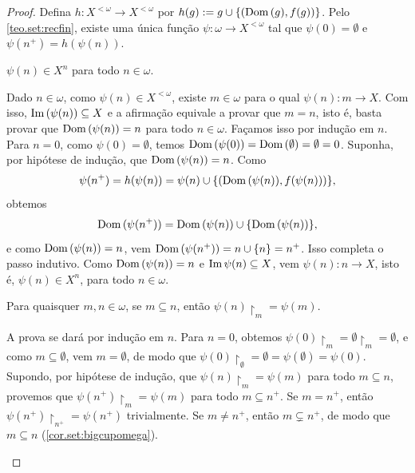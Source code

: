 \begin{proof}
    Defina $h : X^{< \omega} \to X^{< \omega}$ por $h(g) := g \cup \{(\operatorname{Dom}{(g)}, f(g)) \}$. Pelo \cref{teo.set:recfin}, existe uma única função $\psi : \omega \to X^{< \omega}$ tal que $\psi(0) = \emptyset$ e $\psi(n^+) = h(\psi(n))$.
        \begin{claim} \label{set:reccom.claim.dompsin}
            $\psi(n) \in X^n$ para todo $n \in \omega$.
        \end{claim}
        \begin{midproof}
            Dado $n \in \omega$, como $\psi(n) \in X^{< \omega}$, existe $m \in \omega$ para o qual $\psi(n) : m \to X$. Com isso, $\operatorname{Im}{(\psi(n))} \subseteq X$ e a afirmação equivale a provar que $m = n$, isto é, basta provar que $\operatorname{Dom}{(\psi(n))} = n$ para todo $n \in \omega$. Façamos isso por indução em $n$. Para $n=0$, como $\psi(0) = \emptyset$, temos $\operatorname{Dom}{(\psi(0))} = \operatorname{Dom}{(\emptyset)} = \emptyset = 0$. Suponha, por hipótese de indução, que $\operatorname{Dom}{(\psi(n))} = n$. Como
                \[
                    \psi(n^+) = h(\psi(n)) = \psi(n) \cup \{ (\operatorname{Dom}{(\psi(n))}, f(\psi(n)))\},
                \]
            obtemos
                \[
                    \operatorname{Dom}{(\psi(n^+))} = \operatorname{Dom}{(\psi(n))} \cup \{ \operatorname{Dom}{(\psi(n))} \},
                \]
            e como $\operatorname{Dom}{(\psi(n))} = n$, vem $\operatorname{Dom}{(\psi(n^+))} = n \cup \{ n \} = n^+$. Isso completa o passo indutivo. Como $\operatorname{Dom}{(\psi(n))} = n$ e $\operatorname{Im}{\psi(n)} \subseteq X$, vem $\psi(n) : n \to X$, isto é, $\psi(n) \in X^n$, para todo $n \in \omega$. \whiteproof
        \end{midproof}
        \begin{claim} \label{set:reccom.claim.restricao}
            Para quaisquer $m,n \in \omega$, se $m \subseteq n$, então $\psi(n) \restriction_m = \psi(m)$.
        \end{claim}
        \begin{midproof}
            A prova se dará por indução em $n$. Para $n=0$, obtemos $\psi(0) \restriction_m = \emptyset \restriction_m = \emptyset$, e como $m \subseteq \emptyset$, vem $m = \emptyset$, de modo que $\psi(0) \restriction_{\emptyset} = \emptyset = \psi(\emptyset) = \psi(0)$. Supondo, por hipótese de indução, que $\psi(n) \restriction_m = \psi(m)$ para todo $m \subseteq n$, provemos que $\psi(n^+) \restriction_m = \psi(m)$ para todo $m \subseteq n^+$. Se $m = n^+$, então $\psi(n^+) \restriction_{n^+} = \psi(n^+)$ trivialmente. Se $m \neq n^+$, então $m \subsetneq n^+$, de modo que $m \subseteq n$ (\cref{cor.set:bigcupomega}). 

\end{midproof}
\end{proof}
